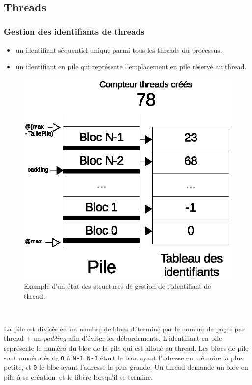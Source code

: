\documentclass{article}
\begin{document}
	\subsection{Threads}
		\subsubsection{Gestion des identifiants de threads}
			\begin{itemize}
				\item{un identifiant séquentiel unique parmi tous les threads du processus.}
				\item{un identifiant en pile qui représente l'emplacement en pile réservé au thread.}
			\end{itemize}
			\begin{figure}[h]
				  \centering
				  \includegraphics{schema_threads_id.eps}
				  \caption{Exemple d'un état des structures de gestion de l’identifiant de thread.}
			\end{figure}
			~\par{La pile est divisée en un nombre de blocs déterminé par le nombre de pages par thread + un \emph{padding} afin d'éviter les débordements. L'identifiant en pile représente le numéro du bloc de la pile qui est alloué au thread. Les blocs de pile sont numérotés de \texttt{0} à \texttt{N-1}. \texttt{N-1} étant le bloc ayant l'adresse en mémoire la plus petite, et \texttt{0} le bloc ayant l'adresse la plus grande. Un thread demande un bloc en pile à sa création, et le libère lorsqu'il se termine.}
\end{document}
